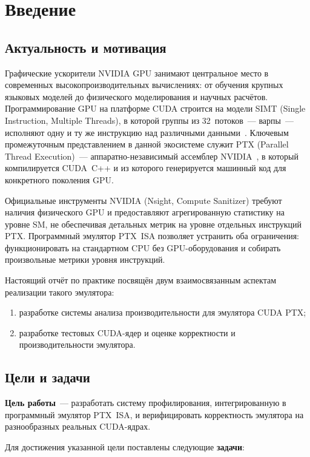 \section{Введение}

\subsection{Актуальность и мотивация}

Графические ускорители NVIDIA GPU занимают центральное место в современных
высокопроизводительных вычислениях: от обучения крупных языковых моделей до
физического моделирования и научных расчётов. Программирование GPU на платформе
CUDA строится на модели SIMT (Single Instruction, Multiple Threads), в которой
группы из 32~потоков~--- варпы~--- исполняют одну и ту же инструкцию над
различными данными~\cite{Lindholm2008, Nickolls2008}. Ключевым промежуточным
представлением в данной экосистеме служит PTX (Parallel Thread Execution)~---
аппаратно-независимый ассемблер NVIDIA~\cite{PTXISA}, в который компилируется
CUDA~C++ и из которого генерируется машинный код для конкретного поколения GPU.

Официальные инструменты NVIDIA (Nsight, Compute Sanitizer) требуют наличия
физического GPU и предоставляют агрегированную статистику на уровне SM,
не обеспечивая детальных метрик на уровне отдельных инструкций PTX.
Программный эмулятор PTX~ISA позволяет устранить оба ограничения: функционировать
на стандартном CPU без GPU-оборудования и собирать произвольные метрики
уровня инструкций.

Настоящий отчёт по практике посвящён двум взаимосвязанным аспектам реализации
такого эмулятора:
\begin{enumerate}
  \item разработке системы анализа производительности для эмулятора CUDA PTX;
  \item разработке тестовых CUDA-ядер и оценке корректности и производительности эмулятора.
\end{enumerate}

\subsection{Цели и задачи}

\textbf{Цель работы}~--- разработать систему профилирования, интегрированную в
программный эмулятор PTX~ISA, и верифицировать корректность эмулятора на
разнообразных реальных CUDA-ядрах.

Для достижения указанной цели поставлены следующие \textbf{задачи}:

